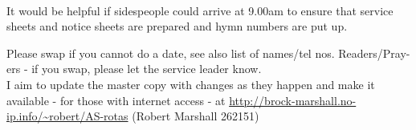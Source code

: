 \documentclass[10pt]{article}
\begin{document}
\begin{center}
\vspace{1em}
\\ %
\end{center}
\begin{minipage}{0.7\textwidth}
{\footnotesize It would be helpful if sidespeople 
could arrive at 9.00am to ensure that service sheets and notice sheets are 
prepared and hymn numbers are put up.

Please swap if you cannot do a date, see also list of names/tel nos.
Readers/Pray-ers - if you swap, please let the service leader know.\\
I aim to update the master copy with changes as they
happen and make it available - for those with internet access
\linebreak - at
\url{http://brock-marshall.no-ip.info/~robert/AS-rotas}
(Robert Marshall 262151)}
\end{minipage}
\end{document}
